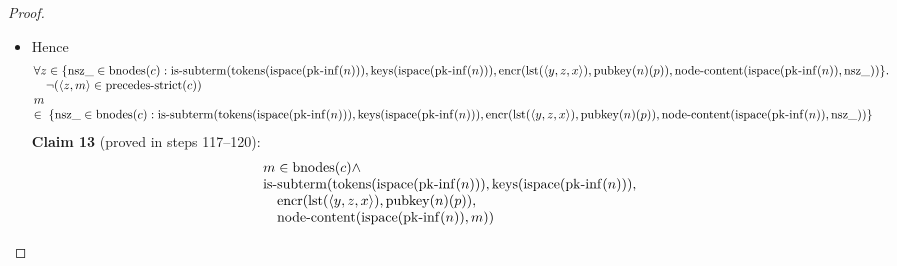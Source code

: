 \documentclass[11pt]{article}
\theoremstyle{plain}
\begin{document}
\begin{proof}
\begin{itemize}[leftmargin=2.8em, itemsep=4pt, parsep=1pt]
  \item[\textbf{114--116}] Hence 
\begin{equation*}
\begin{array}{@{}l@{}}
\begin{array}{@{}l@{}} \forall z \in \{\operatorname{nsz\_} \in \operatorname{bnodes}(c) : \operatorname{is\text{-}subterm}(\operatorname{tokens}(\operatorname{ispace}(\operatorname{pk\text{-}inf}(n))), \operatorname{keys}(\operatorname{ispace}(\operatorname{pk\text{-}inf}(n))), \operatorname{encr}(\operatorname{lst}(\langle y, z, x \rangle), \operatorname{pubkey}(n)(p)), \operatorname{node\text{-}content}(\operatorname{ispace}(\operatorname{pk\text{-}inf}(n)), \operatorname{nsz\_}))\}. \\ \quad \neg (\langle z, m \rangle \in \operatorname{precedes\text{-}strict}(c)) \end{array} \\
\begin{array}{@{}l@{}} m \\ \in\; \{\operatorname{nsz\_} \in \operatorname{bnodes}(c) : \operatorname{is\text{-}subterm}(\operatorname{tokens}(\operatorname{ispace}(\operatorname{pk\text{-}inf}(n))), \operatorname{keys}(\operatorname{ispace}(\operatorname{pk\text{-}inf}(n))), \operatorname{encr}(\operatorname{lst}(\langle y, z, x \rangle), \operatorname{pubkey}(n)(p)), \operatorname{node\text{-}content}(\operatorname{ispace}(\operatorname{pk\text{-}inf}(n)), \operatorname{nsz\_}))\} \end{array}
\end{array}
\end{equation*}
\textbf{Claim 13} (proved in steps 117--120):
\begin{equation*}
\begin{array}{@{}l@{}} m \in \operatorname{bnodes}(c) \wedge \\ \operatorname{is\text{-}subterm}(\operatorname{tokens}(\operatorname{ispace}(\operatorname{pk\text{-}inf}(n))), \operatorname{keys}(\operatorname{ispace}(\operatorname{pk\text{-}inf}(n))), \\ \quad \operatorname{encr}(\operatorname{lst}(\langle y, z, x \rangle), \operatorname{pubkey}(n)(p)), \\ \quad \operatorname{node\text{-}content}(\operatorname{ispace}(\operatorname{pk\text{-}inf}(n)), m)) \end{array}
\end{equation*}


\end{itemize}
\end{proof}
\end{document}
